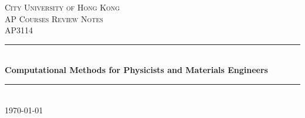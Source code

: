 \documentclass[a4paper]{book}
\begin{document}
\frontmatter

\begin{titlepage}
\newcommand{\HRule}{\rule{\linewidth}{0.5mm}} %

\center %


\textsc{\LARGE City University of Hong Kong}\\[1.5cm] %
\textsc{\Large AP Courses Review Notes}\\[0.5cm] 		%
\textsc{\large {AP3114}}\\[0.5cm] 						%


\HRule \\[0.4cm]
{ \huge \bfseries  \textsf{Computational Methods for Physicists and Materials Engineers} }\\[0.4cm] %
\HRule \\[1.5cm]







{\large \today}\\[2cm] %

\vspace{5cm}



\end{titlepage}
\end{document}
